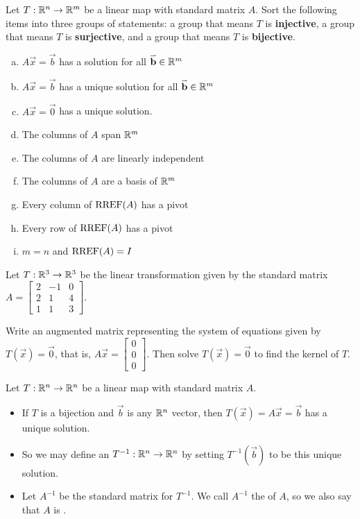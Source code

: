 \begin{activity}{15}
Let \(T: \mathbb{R}^n \rightarrow \mathbb{R}^m\) be a linear map with standard matrix \(A\).
Sort the following items into three groups of statements: a group that means
\(T\) is \textbf{injective}, a group that means \(T\) is \textbf{surjective},
and a group that means \(T\) is \textbf{bijective}.
\begin{multicols}{2}
\begin{enumerate}[(a)]
\item \(A\vec x=\vec b\) has a solution for all \(\mathbf{\accentset{\rightharpoonup}{b}}\in\mathbb{R}^m\)
\item \(A\vec x=\vec b\) has a unique solution for all \(\mathbf{\accentset{\rightharpoonup}{b}}\in\mathbb{R}^m\)
\item \(A\vec x=\vec 0\) has a unique solution.
\item The columns of \(A\) span \(\mathbb{R}^m\)
\item The columns of \(A\) are linearly independent
\item The columns of \(A\) are a basis of \(\mathbb{R}^m\)
\item Every column of \(\operatorname{RREF}(A)\) has a pivot
\item Every row of \(\operatorname{RREF}(A)\) has a pivot
\item \(m=n\) and \(\operatorname{RREF}(A)=I\)
\end{enumerate}
\end{multicols}
\end{activity}

\begin{activity}{5}
  Let \(T: \mathbb{R}^3 \rightarrow \mathbb{R}^3\) be the linear transformation given by the standard matrix
  \(A=\begin{bmatrix} 2 & -1 & 0 \\ 2 & 1 & 4 \\ 1 & 1 & 3 \end{bmatrix}\).
  
  Write an augmented matrix representing the system of equations given by \(T(\vec x)=\vec{0}\),
  that is, \(A\vec x=\begin{bmatrix}0 \\ 0 \\ 0 \end{bmatrix}\).
  Then solve \(T(\vec x)=\vec{0}\) to find the kernel of \(T\).
\end{activity}


\begin{definition}
  Let \(T: \mathbb{R}^n \rightarrow \mathbb{R}^n\) be a linear map with standard matrix \(A\).
\begin{itemize}
\item  If \(T\) is a bijection and \(\vec b\) is any \(\mathbb{R}^n\) vector, 
  then \(T(\vec x)=A\vec x=\vec b\) has a unique solution.
\item So we may define an  \(T^{-1} : \mathbb{R}^n \rightarrow \mathbb{R}^n\) 
  by setting \(T^{-1}(\vec b)\) to be this unique solution.
\item Let \(A^{-1}\) be the standard matrix for \(T^{-1}\). We call \(A^{-1}\) the
 of \(A\), so we also say that \(A\) is .
\end{itemize}
\end{definition}


